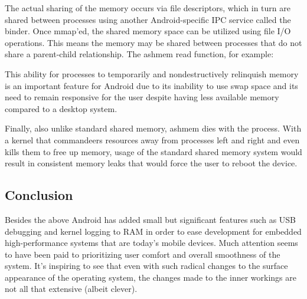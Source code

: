 \documentclass[12pt,letterpaper]{article}
\begin{document}
The actual sharing of the memory occurs via file descriptors, which in turn are
shared between processes using another Android-specific IPC service called the
binder. Once mmap'ed, the shared memory space can be utilized using file I/O
operations. This means the memory may be shared between processes that do not
share a parent-child relationship. The ashmem read function, for example:

This ability for processes to temporarily and nondestructively relinquish
memory is an important feature for Android due to its inability to use swap
space and its need to remain responsive for the user despite having less
available memory compared to a desktop system.

Finally, also unlike standard shared memory, ashmem dies with the process. With
a kernel that commandeers resources away from processes left and right and even
kills them to free up memory, usage of the standard shared memory system would
result in consistent memory leaks that would force the user to reboot the
device.


\subsection*{Conclusion}

Besides the above Android has added small but significant features such as USB
debugging and kernel logging to RAM in order to ease development for embedded
high-performance systems that are today's mobile devices. Much attention seems
to have been paid to prioritizing user comfort and overall smoothness of the
system. It's inspiring to see that even with such radical changes to the
surface appearance of the operating system, the changes made to the inner
workings are not all that extensive (albeit clever).
\end{document}
